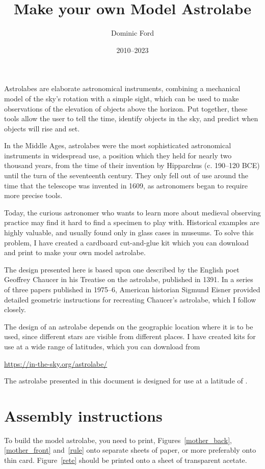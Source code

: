 \documentclass[a4paper,onecolumn,10pt]{article}
\title{Make your own Model Astrolabe}
\author{Dominic Ford}
\date{2010--2023}
\begin{document}
\maketitle
\setcounter{footnote}{1}

Astrolabes are elaborate astronomical instruments, combining a mechanical model
of the sky's rotation with a simple sight, which can be used to make
observations of the elevation of objects above the horizon. Put together, these
tools allow the user to tell the time, identify objects in the sky, and predict
when objects will rise and set.

In the Middle Ages, astrolabes were the most sophisticated astronomical
instruments in widespread use, a position which they held for nearly two
thousand years, from the time of their invention by Hipparchus (c. 190--120
BCE) until the turn of the seventeenth century. They only fell out of use
around the time that the telescope was invented in 1609, as astronomers began
to require more precise tools.

Today, the curious astronomer who wants to learn more about medieval observing
practice may find it hard to find a specimen to play with. Historical examples
are highly valuable, and usually found only in glass cases in museums. To solve
this problem, I have created a cardboard cut-and-glue kit which you can
download and print to make your own model astrolabe.

The design presented here is based upon one described by the English poet
Geoffrey Chaucer in his Treatise on the astrolabe, published in 1391. In a
series of three papers published in 1975--6, American historian Sigmund Eisner
provided detailed geometric instructions for recreating Chaucer's astrolabe,
which I follow closely.

The design of an astrolabe depends on the geographic location where it is to be
used, since different stars are visible from different places. I have created
kits for use at a wide range of latitudes, which you can download from

\url{https://in-the-sky.org/astrolabe/}

The astrolabe presented in this document is designed for use at a latitude of
.

\section*{Assembly instructions}

To build the model astrolabe, you need to print, Figures~\ref{mother_back},
\ref{mother_front} and~\ref{rule} onto separate sheets of paper, or more
preferably onto thin card. Figure~\ref{rete} should be printed onto a sheet of
transparent acetate.
\end{document}

